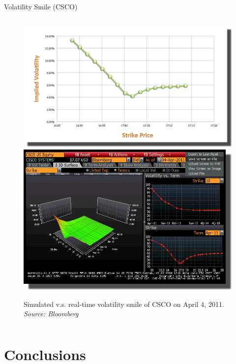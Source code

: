 \documentclass{beamer}
\begin{document}
\begin{frame}[shrink=50]{{\color{cyan}Volatility Smile ({\color{magenta}CSCO})}}
\begin{columns}
\begin{column}{0.7\textwidth}
\begin{figure}[htbp]
                \centering
                \includegraphics[height=0.75\textheight]{CSCO/CSCO_20110404_Simulated_Volatility_Smile.png}\\
                \includegraphics[height=0.75\textheight]{CSCO/CSCO_20110404_B.png}\\
                \caption{Simulated v.s. real-time volatility smile of CSCO on April 4, 2011. \textit{Source: Bloomberg}}
                \label{fig:CSCO_VolSmile_SimvsReal}
\end{figure}
\end{column}
\end{columns}

\end{frame}


\section{Conclusions}
\end{document}
